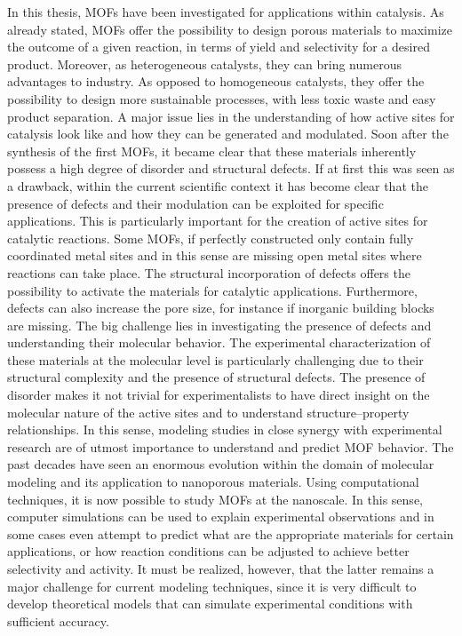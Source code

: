 In this thesis, MOFs have been investigated for applications within catalysis. As already stated, MOFs offer the possibility to design porous materials to maximize the outcome of a given reaction, in terms of yield and selectivity for a desired product. Moreover, as heterogeneous catalysts, they can bring numerous advantages to industry. As opposed to homogeneous catalysts, they offer the possibility to design more sustainable processes, with less toxic waste and easy product separation.
\npar
A major issue lies in the understanding of how active sites for catalysis look like and how they can be generated and modulated. Soon after the synthesis of the first MOFs, it became clear that these materials inherently possess a high degree of disorder and structural defects. If at first this was seen as a drawback, within the current scientific context it has become clear that the presence of defects and their modulation can be exploited for specific applications. This is particularly important for the creation of active sites for catalytic reactions. Some MOFs, if perfectly constructed only contain fully coordinated metal sites and in this sense are missing open metal sites where reactions can take place. The structural incorporation of defects offers the possibility to activate the materials for catalytic applications. Furthermore, defects can also increase the pore size, for instance if inorganic building blocks are missing. The big challenge lies in investigating the presence of defects and understanding their molecular behavior.
\npar
The experimental characterization of these materials at the molecular level is particularly challenging due to their structural complexity and the presence of structural defects. The presence of disorder makes it not trivial for experimentalists to have direct insight on the molecular nature of the active sites and to understand structure--property relationships. In this sense, modeling studies in close synergy with experimental research are of utmost importance to understand and predict MOF behavior. 
\npar
The past decades have seen an enormous evolution within the domain of molecular modeling and its application to nanoporous materials. Using computational techniques, it is now possible to study MOFs at the nanoscale. In this sense, computer simulations can be used to explain experimental observations and in some cases even attempt to predict what are the appropriate materials for certain applications, or how reaction conditions can be adjusted to achieve better selectivity and activity. It must be realized, however, that the latter remains a major challenge for current modeling techniques, since it is very difficult to develop theoretical models that can simulate experimental conditions with sufficient accuracy.
